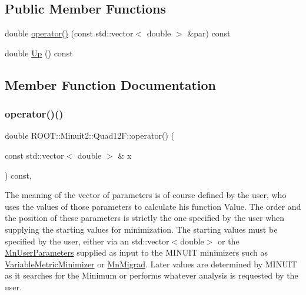 \subsection*{Public Member Functions}
\begin{DoxyCompactItemize}
\item 
double \mbox{\hyperlink{classROOT_1_1Minuit2_1_1Quad12F_ad68fa5e48b2de950139a1e73a5a0558b}{operator()}} (const std\+::vector$<$ double $>$ \&par) const
\item 
double \mbox{\hyperlink{classROOT_1_1Minuit2_1_1Quad12F_afbb216349fbceafc530845fe1cff5af4}{Up}} () const
\end{DoxyCompactItemize}


\subsection{Member Function Documentation}
\mbox{\label{classROOT_1_1Minuit2_1_1Quad12F_ad68fa5e48b2de950139a1e73a5a0558b}} 
\subsubsection{\texorpdfstring{operator()()}{operator()()}}
{\footnotesize\ttfamily double R\+O\+O\+T\+::\+Minuit2\+::\+Quad12\+F\+::operator() (\begin{DoxyParamCaption}\item[{const std\+::vector$<$ double $>$ \&}]{x }\end{DoxyParamCaption}) const\hspace{0.3cm}{\ttfamily [inline]}, {\ttfamily [virtual]}}

The meaning of the vector of parameters is of course defined by the user, who uses the values of those parameters to calculate his function Value. The order and the position of these parameters is strictly the one specified by the user when supplying the starting values for minimization. The starting values must be specified by the user, either via an std\+::vector$<$double$>$ or the \mbox{\hyperlink{classROOT_1_1Minuit2_1_1MnUserParameters}{Mn\+User\+Parameters}} supplied as input to the M\+I\+N\+U\+IT minimizers such as \mbox{\hyperlink{classROOT_1_1Minuit2_1_1VariableMetricMinimizer}{Variable\+Metric\+Minimizer}} or \mbox{\hyperlink{classROOT_1_1Minuit2_1_1MnMigrad}{Mn\+Migrad}}. Later values are determined by M\+I\+N\+U\+IT as it searches for the Minimum or performs whatever analysis is requested by the user.


